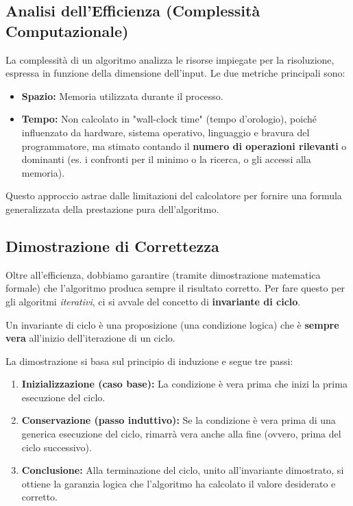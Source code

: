 \documentclass[12pt, a4paper]{article}
\begin{document}
\subsection{Analisi dell'Efficienza (Complessità Computazionale)}
La complessità di un algoritmo analizza le risorse impiegate per la risoluzione, espressa in funzione della dimensione dell'input.
Le due metriche principali sono:
\begin{itemize}
\item \textbf{Spazio:} Memoria utilizzata durante il processo.
\item \textbf{Tempo:} Non calcolato in "wall-clock time" (tempo d'orologio), poiché influenzato da hardware, sistema operativo, linguaggio e bravura del programmatore, ma stimato contando il \textbf{numero di operazioni rilevanti} o dominanti (es. i confronti per il minimo o la ricerca, o gli accessi alla memoria).
\end{itemize}
Questo approccio astrae dalle limitazioni del calcolatore per fornire una formula generalizzata della prestazione pura dell'algoritmo.

\subsection{Dimostrazione di Correttezza}
Oltre all'efficienza, dobbiamo garantire (tramite dimostrazione matematica formale) che l'algoritmo produca sempre il risultato corretto. Per fare questo per gli algoritmi \textit{iterativi}, ci si avvale del concetto di \textbf{invariante di ciclo}.

\begin{tcolorbox}[colback=lightergray!10, colframe=tocsec, title=\textbf{Definizione: Invariante di Ciclo}]
Un invariante di ciclo è una proposizione (una condizione logica) che è \textbf{sempre vera} all'inizio dell'iterazione di un ciclo.
\end{tcolorbox}

La dimostrazione si basa sul principio di induzione e segue tre passi:
\begin{enumerate}
\item \textbf{Inizializzazione (caso base):} La condizione è vera prima che inizi la prima esecuzione del ciclo.
\item \textbf{Conservazione (passo induttivo):} Se la condizione è vera prima di una generica esecuzione del ciclo, rimarrà vera anche alla fine (ovvero, prima del ciclo successivo).
\item \textbf{Conclusione:} Alla terminazione del ciclo, unito all'invariante dimostrato, si ottiene la garanzia logica che l'algoritmo ha calcolato il valore desiderato e corretto.
\end{enumerate}
\end{document}
